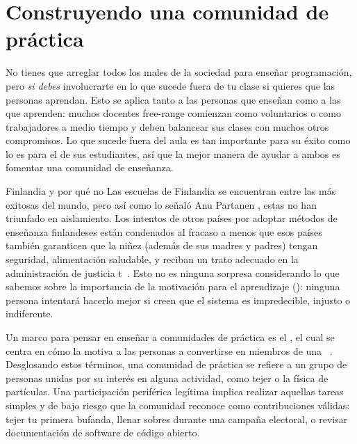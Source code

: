 \chapter{Construyendo una comunidad de práctica}\label{s:community}

No tienes que arreglar todos los males de la sociedad para enseñar programación,
pero \emph{si debes} involucrarte en
lo que sucede fuera de tu clase si quieres que las personas aprendan.
Esto se aplica tanto a las personas que enseñan como a las que aprenden:
muchos docentes free-range comienzan como voluntarios o como trabajadores a medio tiempo
y deben balancear  sus clases con muchos otros compromisos.
Lo que sucede fuera del aula es tan importante para su éxito
como lo es para el de sus estudiantes,
así que la mejor manera de ayudar a ambos es fomentar una comunidad de enseñanza.


\begin{aside}{Finlandia y por qué no}
Las escuelas de Finlandia se encuentran entre las más exitosas del mundo,
pero así como lo señaló Anu Partanen
  ,
estas no han triunfado en aislamiento.
  Los intentos de otros países por adoptar métodos de enseñanza finlandeses están condenados al fracaso
  a menos que esos países también garanticen que la niñez (además de sus madres y padres) tengan seguridad, alimentación saludable,  y reciban un trato adecuado en la administración de justicia t~\cite{Sahl2015, Wilk2011}.
  Esto no es ninguna sorpresa considerando lo que sabemos sobre la importancia de la motivación para el aprendizaje ():
  ninguna persona intentará hacerlo mejor si creen que el sistema es impredecible, injusto o indiferente.
\end{aside}

Un marco para pensar en enseñar a comunidades de práctica  es el ,
el cual  se centra en cómo la  
motiva a las personas a convertirse en miembros de
una ~\cite{Weng2015}.
Desglosando estos términos,
una comunidad de práctica se refiere a  un grupo de personas unidas por su interés en alguna actividad,
como tejer o la física de partículas.
Una  participación periférica legítima implica realizar aquellas tareas simples y de bajo riesgo
que la comunidad reconoce como contribuciones válidas:
tejer tu primera bufanda,
llenar sobres durante una campaña electoral,
o revisar documentación de software de código abierto.

